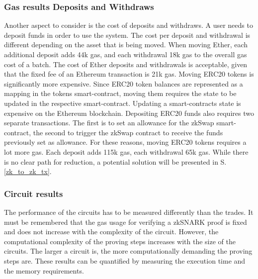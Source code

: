 \documentclass[../../thesis.tex]{subfiles}
\begin{document}
\subsubsection{Gas results Deposits and Withdraws}
Another aspect to consider is the cost of deposits and withdraws. A user needs to deposit funds in order to use the system. The cost per deposit and withdrawal is different depending on the asset that is being moved. When moving Ether, each additional deposit adds 44k gas, and each withdrawal 18k gas to the overall gas cost of a batch. The cost of Ether deposits and withdrawals is acceptable, given that the fixed fee of an Ethereum transaction is 21k gas. Moving ERC20 tokens is significantly more expensive. Since ERC20 token balances are represented as a mapping in the tokens smart-contract, moving them requires the state to be updated in the respective smart-contract. Updating a smart-contracts state is expensive on the Ethereum blockchain. Depositing ERC20 funds also requires two separate transactions. The first is to set an allowance for the zkSwap smart-contract, the second to trigger the zkSwap contract to receive the funds previously set as allowance. For these reasons, moving ERC20 tokens requires a lot more gas. Each deposit adds 115k gas, each withdrawal 65k gas. While there is no clear path for reduction, a potential solution will be presented in S. \ref{zk_to_zk_tx}.

\subsubsection{Circuit results}
The performance of the circuits has to be measured differently than the trades. It must be remembered that the gas usage for verifying a zkSNARK proof is fixed and does not increase with the complexity of the circuit. However, the computational complexity of the proving steps increases with the size of the circuits. The larger a circuit is, the more computationally demanding the proving steps are. These results can be quantified by measuring the execution time and the memory requirements. 
\end{document}
